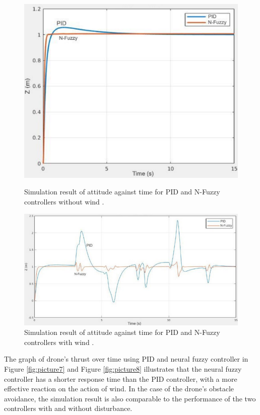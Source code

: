 \begin{figure}[H]
\centering
\begin{minipage}{.5\textwidth}
    \centering
    \includegraphics[width=0.95\linewidth]{img/Picture5.png}
    \caption[Simulation result of attitude against time for PID and N-Fuzzy controllers without wind.]{Simulation result of attitude against time for PID and N-Fuzzy controllers without wind \cite{boxi7}.}
    \label{fig:picture5}
\end{minipage}%
\begin{minipage}{.5\textwidth}
    \centering
    \includegraphics[width=0.95\linewidth]{img/Picture6.png}
    \caption[Simulation result of attitude against time for PID and N-Fuzzy controllers with wind.]{Simulation result of attitude against time for PID and N-Fuzzy controllers with wind \cite{boxi7}.}
    \label{fig:picture6}
\end{minipage}
\end{figure}
The graph of drone’s thrust over time using PID and neural fuzzy controller in Figure \ref{fig:picture7} and Figure \ref{fig:picture8} illustrates that the neural fuzzy controller has a shorter response time than the PID controller, with a more effective reaction on the action of wind. In the case of the drone's obstacle avoidance, the simulation result is also comparable to the performance of the two controllers with and without disturbance.

